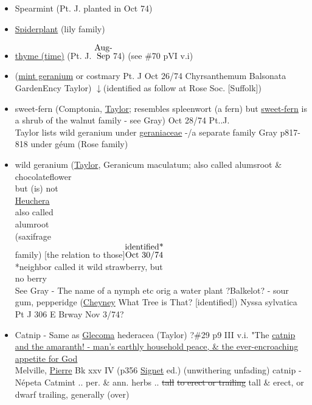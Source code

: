 \documentclass[a4paper,10pt]{article}
\begin{document}
\begin{flushleft}
\begin{itemize}
\color{blue}
\normalsize
Oct 18/74
\small
\color{red}
John Parkinson 1629 \ul{Paradisus Terrestis} "The rarity \& novelty of this herb, being for the most part but in the gardens of great persons, doth cause it to be of great regard"
\color{blue}
\normalsize
\item Spearmint (Pt. J. planted in Oct 74)
\item \ul{Spiderplant} (lily family)
\item \ul{thyme (time)} (Pt. J. {$\stackrel{\hbox{Aug-}}{\hbox{Sep}}$}74) (see \#70 pVI v.i)
\item (\ul{mint geranium} or costmary Pt. J Oct 26/74 
Chyrsanthemum Balsonata GardenEncy Taylor)
$\downarrow$(identified as follow at Rose Soc. [Suffolk])
\item sweet-fern (Comptonia, \ul{Taylor}; resembles spleenwort (a fern) but \ul{sweet-fern} is a shrub of the walnut family - see Gray)
Oct 28/74 Pt..J.\\
\color{red}
\footnotesize
Taylor lists wild geranium under \ul{geraniaceae} -/a separate family 
Gray p817-818 %
under g\'eum (Rose family)
\color{blue}
\normalsize
\item wild geranium (\ul{Taylor}, Geranicum maculatum; also called alumsroot \& chocolateflower\\
\color{red}
but (is) not\\
\ul{Heuchera}\\
also called\\
 alumroot\\
(saxifrage\\
family)
\color{blue}
[the relation to those]{$\stackrel{\hbox{identified*}}{\hbox{Oct 30/74}}$}\\
*neighbor called it wild strawberry, but\\ 
no berry\\
See Gray - The name of a nymph etc orig a water plant 
?Balkelot? - sour gum, pepperidge \color{red} (\ul{Cheyney} What Tree is That? [identified])
\color{blue}Nyssa sylvatica Pt J 306 E Brway Nov 3/74?


\item Catnip - Same as \underline{Glecoma} hederacea (Taylor)
?\#29 p9 III v.i. "The \ul{catnip and the amaranth! - man's earthly household
peace, \& the ever-encroaching appetite for God}\\
Melville, \ul{Pierre} Bk xxv IV (p356 \ul{Signet} ed.)
\color{red}
(unwithering
unfading) %
\color{red}
catnip - N\'epeta %
Catmint .. per. \& ann. herbs .. \sout{tall}
\sout{to erect or trailing} tall \& erect, or dwarf trailing, generally (over)
\end{itemize}
\end{flushleft}
\end{document}
